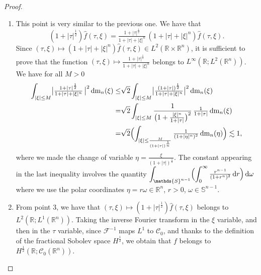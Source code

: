 \documentclass[a4paper, 12pt]{article}
\theoremstyle{plain}
\theoremstyle{definition}
\theoremstyle{remark}
\numberwithin{equation}{section}
\begin{document}
\begin{proof}
\begin{enumerate}
\begin{align*}
=& \sqrt{2} \int_{-\frac{T}{1+|\xi|^n}}^{\frac{T}{1+|\xi|^n}}\tfrac{1}{(1+|\sigma|)^2}\,
{\rm dm}_1(\sigma)
\le  \frac{2}{\sqrt{\pi}},
\end{align*}
%
where the first inequality comes from the fact that $\frac{a+b}{\sqrt{a^2+b^2}}\le \sqrt{2}$ for all $a,b>0$ and we made the change 
of variable $\sigma=\frac{\tau}{1+|\xi|^n}$ in the last integral. The last inequality is obtained 
by taking $T\to +\infty$.
%
\item
This point is very similar to the previous one. We have that 
\[
(1+|\tau|^{\frac{1}{2}})\hat{f}(\tau,\xi)=
\tfrac{1+|\tau|^{\frac{1}{2}}}{1+|\tau|+|\xi|^n}\,(1+|\tau|+|\xi|^n)\hat{f}(\tau,\xi).
\]
Since $(\tau,\xi)\mapsto(1+|\tau|+|\xi|^n)\hat{f}(\tau,\xi) \in L^2({\mathds{R}}\times{\mathds{R}}^n)$, it is sufficient to prove that the function
$(\tau,\xi)\mapsto \frac{1+|\tau|^{\frac{1}{2}}}{1+|\tau|+|\xi|^n}$ belongs to $L^\infty({\mathds{R}};L^2({\mathds{R}}^n))$.
We have for all $M>0$ 
%
\begin{align*}
\int_{|\xi|\le M} \bigl|\tfrac{1+|\tau|^{\frac{1}{2}}}{1+|\tau|+|\xi|^n}\,\bigr|^2\,{\rm dm}_n(\xi)
\le& \sqrt{2} \int_{|\xi|\le M}\bigl|\tfrac{(1+|\tau|)^{\frac{1}{2}}}{1+|\tau|+|\xi|^n}\bigr|^2\,{\rm dm}_n(\xi)\\
=& \sqrt{2} \int_{|\xi|\le M}\frac{1}{\bigl(1+\frac{|\xi|^n}{1+|\tau|}\bigr)^2}\,\tfrac{1}{1+|\tau|}\, 
{\rm dm}_n(\xi)\\
=& \sqrt{2} \Bigl(\int_{|\xi|\le \frac{M}{(1+|\tau|)^{\frac{1}{n}}}} \tfrac{1}{(1+|\eta|^n)^2}\,
{\rm dm}_n(\eta)\Bigr)
\lesssim 1,
\end{align*}
%
where we made the change of variable $\eta =\frac{\xi}{(1+|\tau|)^{\frac{1}{n}}}$. The constant appearing in the last inequality
involves the quantity $\displaystyle{\int_{{\mathds{S}}^{n-1}}\Bigl(\int_0^\infty \tfrac{r^{n-1}}{(1+r^n)^2}\, {\rm d}r\Bigr)\,{\rm d}\omega}$
where we use the polar coordinates $\eta = r\omega\in {\mathds{R}}^n$, $r>0$, $\omega\in{\mathds{S}}^{n-1}$.
%
\item
From point 3, we have that $(\tau,\xi)\mapsto (1+|\tau|^{\frac{1}{2}})\hat{f}(\tau,\xi)$ belongs to $L^2({\mathds{R}};L^1({\mathds{R}}^n))$. 
Taking the inverse Fourier transform in the $\xi$ variable, and then in the $\tau$ variable, since ${\mathscr{F}}^{-1}$ maps
$L^1$ to ${\mathscr{C}}_0$, and thanks to the definition of the fractional Sobolev space $H^{\frac{1}{2}}$, 
we obtain that $f$ belongs to $H^{\frac{1}{2}}({\mathds{R}};{\mathscr{C}}_0({\mathds{R}}^n))$.


\end{enumerate}
\end{proof}
\end{document}
